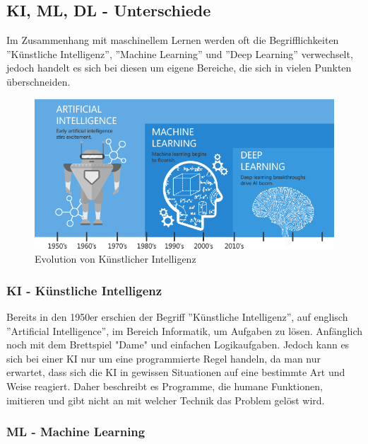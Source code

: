\subsection{KI, ML, DL - Unterschiede}

Im Zusammenhang mit maschinellem Lernen werden oft die Begrifflichkeiten ''Künstliche Intelligenz'', ''Machine Learning'' und ''Deep Learning'' verwechselt, jedoch handelt es sich bei diesen um eigene Bereiche, die sich in vielen Punkten überschneiden.

\begin{figure}[h b]
    \centering
    \includegraphics[scale=0.55]{sections/machine-learning/images/ki-ml-dl.png}
    \caption{Evolution von Künstlicher Intelligenz}
    \label{fig:kimldl-comparison}
\end{figure}

\subsubsection{KI - Künstliche Intelligenz}

Bereits in den 1950er erschien der Begriff ''Künstliche Intelligenz'', auf englisch ''Artificial Intelligence'', im Bereich Informatik, um Aufgaben zu lösen. Anfänglich noch mit dem Brettspiel "Dame" und einfachen Logikaufgaben. Jedoch kann es sich bei einer KI nur um eine programmierte Regel handeln, da man nur erwartet, dass sich die KI in gewissen Situationen auf eine bestimmte Art und Weise reagiert. Daher beschreibt es Programme, die humane Funktionen, imitieren und gibt nicht an mit welcher Technik das Problem gelöst wird. 

\subsubsection{ML - Machine Learning}

